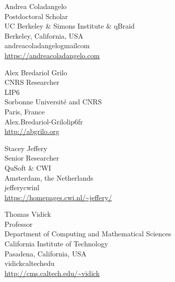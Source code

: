 \begin{tocauthors}
\begin{tocinfo}[coladangelo]
 Andrea Coladangelo\\
 Postdoctoral Scholar\\
 UC Berkeley \& Simons Institute \& qBraid\\
 Berkeley, California, USA\\
 andrea\tocdot{}coladangelo\tocat{}gmail\tocdot{}com\\   %
 \url{https://andreacoladangelo.com}      %
\end{tocinfo}
\begin{tocinfo}[grilo]
 Alex Bredariol Grilo\\
 CNRS Researcher\\
 LIP6\\
 Sorbonne Universit\'e and CNRS\\
 Paris, France\\
 Alex.Bredariol-Grilo\tocat{}lip6\tocdot{}fr \\   %
 \url{http://abgrilo.org}      %
\end{tocinfo}
\begin{tocinfo}[jeffery]
 Stacey Jeffery\\
 Senior Researcher\\
 QuSoft \& CWI\\
 Amsterdam, the Netherlands\\
 jeffery\tocat{}cwi\tocdot{}nl \\   %
 \url{https://homepages.cwi.nl/~jeffery/}      %
\end{tocinfo}
\begin{tocinfo}[vidick]
 Thomas Vidick\\
 Professor\\
 Department of Computing and Mathematical Sciences\\
 California Institute of Technology\\
 Pasadena, California, USA\\
 vidick\tocat{}caltech\tocdot{}edu \\   %
 \url{http://cms.caltech.edu/~vidick}      %
\end{tocinfo}
\end{tocauthors}

